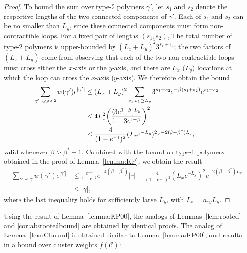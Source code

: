 \begin{proof}
    To bound the sum over type-2 polymers $\gamma'$, let $s_1$ and $s_2$ denote the respective lengths of the two connected components of $\gamma'$. Each of $s_1$ and $s_2$ can be no smaller than $L_y$, since these connected components must form non-contractible loops. For a fixed pair of lengths $(s_1, s_2)$, The total number of type-2 polymers is upper-bounded by $(L_x + L_y)^2 3^{s_1 + s_2}$; the two factors of $(L_x + L_y)$ come from observing that each of the two non-contractible loops must cross either the $x$-axis or the $y$-axis, and there are $L_x$ ($L_y$) locations at which the loop can cross the $x$-axis ($y$-axis). We therefore obtain the bound
    \begin{subequations}
    \label{eq:type2_bound}
        \begin{align}
            \sum_{\gamma' \text{ type-2}} w(\gamma') e^{|\gamma'|} &\leq (L_x + L_y)^2 \sum_{s_1, s_2 \geq L_y} 3^{s_1 + s_2} e^{-\beta(s_1 + s_2)} e^{s_1 + s_2} \\
            &\leq 4L_x^2 \qty( \frac{(3e^{1-\beta})^{L_y}}{1 - 3e^{1-\beta}} )^2 \\
            &\leq \frac{4}{(1 - e^{-1})^2} (L_x e^{-L_y})^2 e^{-2(\beta - \beta^*) L_y} ,
        \end{align}
    \end{subequations}
    valid whenever $\beta > \beta^* - 1$. Combined with the bound on type-1 polymers obtained in the proof of Lemma~\ref{lemma:KP}, we obtain the result
    \begin{subequations}
    \begin{align}
        \sum_{\gamma' \nsim \gamma} w(\gamma') e^{|\gamma'|} &\leq \frac{e^{-4}}{1 - e^{-2}} e^{-4(\beta - \beta^*)} | \gamma| + \frac{4}{(1 - e^{-1})^2} (L_x e^{-L_y})^2 e^{-2(\beta - \beta^*) L_y} \\
        &\leq |\gamma| ,
    \end{align}
    \end{subequations}
    where the last inequality holds for sufficiently large $L_y$, with $L_x = a_{xy} L_y$.
\end{proof}


Using the result of Lemma~\ref{lemma:KP00}, the analogs of Lemmas~\ref{lem:rooted} and \ref{cor:absrootedbound} are obtained by identical proofs. The analog of Lemma~\ref{lem:Cbound} is obtained similar to Lemma~\ref{lemma:KP00}, and results in a bound over cluster weights $f(\mathcal{C})$:

